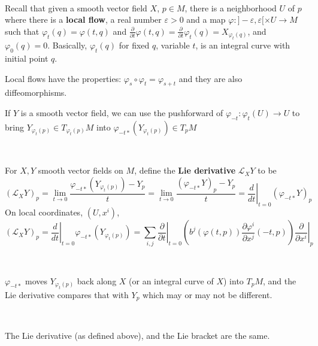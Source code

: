 \documentclass{article}
\begin{document}
\begin{remark}
  \

Recall that given a smooth vector field $X$, $p \in M$, there is a neighborhood $U$ of $p$ where there is a \textbf{local flow}, a real number $\varepsilon > 0$ and a map $\varphi: ]-\varepsilon, \varepsilon[ \times U \to M$ such that $\varphi_t(q) = \varphi(t,q)$ and $\frac{\partial}{\partial t}\varphi(t,q) = \frac{\partial}{\partial t}\varphi_t(q) = X_{\varphi_t(q)}$, and $\varphi_0(q) = 0$. Basically, $\varphi_t(q)$ for fixed $q$, variable $t$, is an integral curve with initial point $q$.

  Local flows have the properties: $\varphi_s \circ \varphi_t = \varphi_{s+t}$ and they are also diffeomorphisms.

  If $Y$ is a smooth vector field, we can use the pushforward of $\varphi_{-t}: \varphi_t(U) \to U$ to bring $Y_{\varphi_t(p)} \in T_{\varphi_t(p)}M$ into $\varphi_{-t*}(Y_{\varphi_t(p)}) \in T_pM$
\end{remark}

\begin{definition}
  \

  For $X,Y$ smooth vector fields on $M$, define the \textbf{Lie derivative} $\mathcal{L}_XY$ to be $$(\mathcal{L}_XY)_p = \lim_{t \to 0} \frac{\varphi_{-t*}(Y_{\varphi_t(p)}) - Y_p}{t} =  \lim_{t\to0} \frac{(\varphi_{-t*}Y)_p - Y_p}{t} = \left.\frac{d}{dt}\right\vert_{t=0} (\varphi_{-t*}Y)_p$$On local coordinates, $(U, x^i)$, $$(\mathcal{L}_XY)_p = \left.\frac{d}{dt}\right\vert_{t=0} \varphi_{-t*}(Y_{\varphi_t(p)}) = \sum_{i,j} \left.\frac{\partial}{\partial t}\right\vert_{t=0} (b^j(\varphi(t,p))\frac{\partial \varphi^i}{\partial x^j}(-t,p))\left.\frac{\partial}{\partial x^i}\right\vert_p $$
\end{definition}

\begin{remark}
  \

  $\varphi_{-t*}$ moves $Y_{\varphi_t(p)}$ back along $X$ (or an integral curve of $X$) into $T_pM$, and the Lie derivative compares that with $Y_p$ which may or may not be different.
\end{remark}

\begin{theorem}
  \

  The Lie derivative (as defined above), and the Lie bracket are the same.
\end{theorem}
\end{document}
